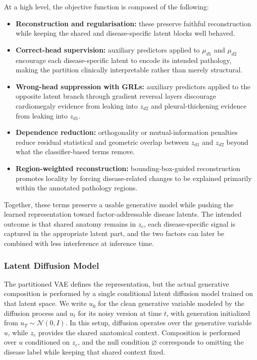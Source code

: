 At a high level, the objective function is composed of the following:
\begin{itemize}
    \item \textbf{Reconstruction and regularisation:} these preserve faithful reconstruction while keeping the shared and disease-specific latent blocks well behaved.

    \item \textbf{Correct-head supervision:} auxiliary predictors applied to $\mu_{d1}$ and $\mu_{d2}$ encourage each disease-specific latent to encode its intended pathology, making the partition clinically interpretable rather than merely structural.

    \item \textbf{Wrong-head suppression with GRLs:} auxiliary predictors applied to the opposite latent branch through gradient reversal layers discourage cardiomegaly evidence from leaking into $z_{d2}$ and pleural-thickening evidence from leaking into $z_{d1}$.

    \item \textbf{Dependence reduction:} orthogonality or mutual-information penalties reduce residual statistical and geometric overlap between $z_{d1}$ and $z_{d2}$ beyond what the classifier-based terms remove.

    \item \textbf{Region-weighted reconstruction:} bounding-box-guided reconstruction promotes locality by forcing disease-related changes to be explained primarily within the annotated pathology regions.
\end{itemize}
Together, these terms preserve a usable generative model while pushing the learned representation toward factor-addressable disease latents. The intended outcome is that shared anatomy remains in $z_c$, each disease-specific signal is captured in the appropriate latent part, and the two factors can later be combined with less interference at inference time.

\subsubsection{Latent Diffusion Model}

The partitioned VAE defines the representation, but the actual generative composition is performed by a single conditional latent diffusion model trained on that latent space. 
We write \(u_0\) for the clean generative variable modeled by the diffusion process and \(u_t\) for its noisy version at time \(t\), with generation initialized from \(u_T \sim \mathcal{N}(0,I)\). 
In this setup, diffusion operates over the generative variable \(u\), while \(z_c\) provides the shared anatomical context. Composition is performed over \(u\) conditioned on \(z_c\), and the null condition \(\varnothing\) corresponds to omitting the disease label while keeping that shared context fixed.

